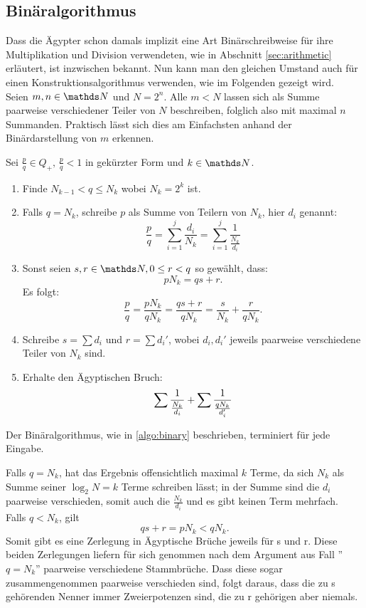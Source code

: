 \subsection{Binäralgorithmus}

Dass die Ägypter schon damals implizit eine Art Binärschreibweise für ihre Multiplikation und Division verwendeten, wie in Abschnitt \ref{sec:arithmetic} erläutert, ist inzwischen bekannt. Nun kann man den gleichen Umstand auch für einen Konstruktionsalgorithmus verwenden, wie im Folgenden gezeigt wird.\\
Seien $m, n \in \N$ und $N = 2^n$. Alle $m < N$ lassen sich als Summe paarweise verschiedener Teiler von $N$ beschreiben, folglich also mit maximal $n$ Summanden. Praktisch lässt sich dies am Einfachsten anhand der Binärdarstellung von $m$ erkennen.

\begin{algorithm}\label{algo:binary}
	Sei $\frac{p}{q} \in Q_+, \, \frac{p}{q} < 1$ in gekürzter Form und $k \in \N$.
	\begin{enumerate}
		\item Finde $N_{k-1} < q \leq N_k$ wobei $N_k=2^k$ ist.
		\item Falls $q = N_k$, schreibe $p$ als Summe von Teilern von $N_k$, hier $d_i$ genannt:
		$$\frac{p}{q} = \sum_{i=1}^{j} \frac{d_i}{N_k}=  \sum_{i = 1}^{j}\frac{1}{\frac{N_k}{d_i}}$$
		\item Sonst seien $s, r \in \N, 0 \leq r < q$ so gewählt, dass:
		$$pN_k = qs+r.$$
		Es folgt:
		$$\frac{p}{q} = \frac{p N_k}{q N_k} = \frac{qs + r}{q N_k} = \frac{s}{N_k} + \frac{r}{q N_k}.$$
		\item Schreibe $s = \sum d_i$ und $r = \sum d_i'$, wobei $d_i, d_i'$ jeweils paarweise verschiedene Teiler von $N_k$ sind.
		\item Erhalte den Ägyptischen Bruch:
		$$\sum \frac{1}{\frac{N_k}{d_i}} + \sum \frac{1}{\frac{q N_k}{d_i'}}$$
	\end{enumerate}
\end{algorithm}

\begin{satz}
	Der Binäralgorithmus, wie in \ref{algo:binary} beschrieben, terminiert für jede Eingabe.
\end{satz}

\begin{bew}
	Falls $q = N_k$, hat das Ergebnis offensichtlich maximal $k$ Terme, da sich $N_k$ als Summe seiner $\log_2 N = k$ Terme schreiben lässt; in der Summe sind die $d_i$ paarweise verschieden, somit auch die $\frac{N_k}{d_i}$ und es gibt keinen Term mehrfach.\\
	Falls $q < N_k$, gilt
	$$qs+r = p N_k < q N_k.$$
	Somit gibt es eine Zerlegung in Ägyptische Brüche jeweils für s und r. Diese beiden Zerlegungen liefern für sich genommen nach dem Argument aus Fall ''$q = N_k$'' paarweise verschiedene Stammbrüche. Dass diese sogar zusammengenommen paarweise verschieden sind, folgt daraus, dass die zu s gehörenden Nenner immer Zweierpotenzen sind, die zu r gehörigen aber niemals.
\end{bew}


